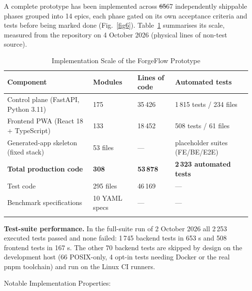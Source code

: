 \documentclass[pdflatex,sn-mathphys-num]{sn-jnl}%
\newcommand{\chg}[1]{{\color{blue}#1}}
\newcommand{\fix}[1]{{\color{fixcol}#1}}
\newcommand{\fixdel}[1]{{\color{fixcol}\sout{#1}}}
\theoremstyle{thmstyleone}%
\theoremstyle{thmstyletwo}%
\theoremstyle{thmstylethree}%
\begin{document}
A complete prototype has been implemented across \fixdel{65}\fix{67} independently shippable phases grouped into 14 epics, each phase gated on its own acceptance criteria and tests before being marked done \chg{(Fig.~\ref{fig6})}. Table~\ref{tab2} summarises its scale, measured from the repository on 4 October 2026 (physical lines of non-test source).%

\begin{table}[t]
\caption{Implementation Scale of the ForgeFlow Prototype}\label{tab2}%
\small
\begin{tabular*}{\textwidth}{@{\extracolsep\fill}p{3.9cm}llp{3.5cm}@{}}
\toprule
\raggedright{}\textbf{Component} & \textbf{Modules} & \textbf{Lines of code} & \raggedright{}\textbf{Automated tests}\tabularnewline
\midrule
\raggedright{}Control plane (FastAPI, Python 3.11) & 175 & 35\,426 & \raggedright{}1\,815 tests / 234 files\tabularnewline
\raggedright{}Frontend PWA (React 18 + TypeScript) & 133 & 18\,452 & \raggedright{}508 tests / 61 files\tabularnewline
\raggedright{}Generated-app skeleton (fixed stack) & 53 files & --- & \raggedright{}placeholder suites (FE/BE/E2E)\tabularnewline
\raggedright{}\textbf{Total production code} & \textbf{308} & \textbf{53\,878} & \raggedright{}\textbf{2\,323 automated tests}\tabularnewline
\raggedright{}Test code & 295 files & 46\,169 & \raggedright{}---\tabularnewline
\raggedright{}Benchmark specifications & 10 YAML specs & --- & \raggedright{}---\tabularnewline
\botrule
\end{tabular*}
\end{table}

\textbf{Test-suite performance.} In the full-suite run of 2 October 2026 all 2\,253 executed tests passed and none failed: 1\,745 backend tests in 653 s and 508 frontend tests in 167 s. The other 70 backend tests are skipped by design on the development host (66 POSIX-only, 4 opt-in tests needing Docker or the real pnpm toolchain) and run on the Linux CI runners.

Notable Implementation Properties:
\end{document}
